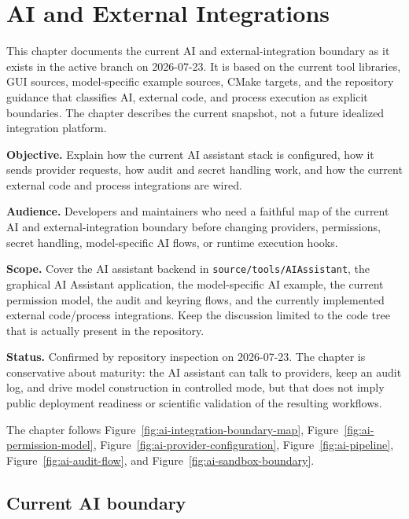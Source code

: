 \chapter{AI and External Integrations}
\label{chap:ai-and-external-integrations}

This chapter documents the current AI and external-integration boundary as it exists in the active branch on 2026-07-23. It is based on the current tool libraries, GUI sources, model-specific example sources, CMake targets, and the repository guidance that classifies AI, external code, and process execution as explicit boundaries. The chapter describes the current snapshot, not a future idealized integration platform.

\noindent\textbf{Objective.} Explain how the current AI assistant stack is configured, how it sends provider requests, how audit and secret handling work, and how the current external code and process integrations are wired.

\noindent\textbf{Audience.} Developers and maintainers who need a faithful map of the current AI and external-integration boundary before changing providers, permissions, secret handling, model-specific AI flows, or runtime execution hooks.

\noindent\textbf{Scope.} Cover the AI assistant backend in \texttt{source/tools/AIAssistant}, the graphical AI Assistant application, the model-specific AI example, the current permission model, the audit and keyring flows, and the currently implemented external code/process integrations. Keep the discussion limited to the code tree that is actually present in the repository.

\noindent\textbf{Status.} Confirmed by repository inspection on 2026-07-23. The chapter is conservative about maturity: the AI assistant can talk to providers, keep an audit log, and drive model construction in controlled mode, but that does not imply public deployment readiness or scientific validation of the resulting workflows.

The chapter follows Figure~\ref{fig:ai-integration-boundary-map},
Figure~\ref{fig:ai-permission-model},
Figure~\ref{fig:ai-provider-configuration},
Figure~\ref{fig:ai-pipeline},
Figure~\ref{fig:ai-audit-flow}, and
Figure~\ref{fig:ai-sandbox-boundary}.

\section{Current AI boundary}
\label{sec:ai-boundary}

